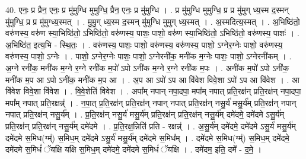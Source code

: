 \documentclass[17pt]{extarticle}
\begin{document}
40. एनः॒ प्र प्रैन॒ एनः॒ प्र मु॑मुग्धि मुमुग्धि॒ प्रैन॒ एनः॒ प्र मु॑मुग्धि । . प्र मु॑मुग्धि मुमुग्धि॒ प्र प्र मु॑मुग् ध्य॒स्म द॒स्मन् मु॑मुग्धि॒ प्र प्र मु॑मुग्ध्य॒स्मत् । . मु॒मु॒ग् ध्य॒स्म द॒स्मन् मु॑मुग्धि मुमुग् ध्य॒स्मत् । . अ॒स्मदित्य॒स्मत् । . अ॒भिष्ठि॑तो॒ वरु॑णस्य॒ वरु॑ण स्या॒भिष्ठि॑तो॒ ऽभिष्ठि॑तो॒ वरु॑णस्य॒ पाशः॒ पाशो॒ वरु॑ण स्या॒भिष्ठि॑तो॒ ऽभिष्ठि॑तो॒ वरु॑णस्य॒ पाशः॑ । . अ॒भिष्ठि॑त॒ इत्य॒भि - स्थि॒तः॒ । . वरु॑णस्य॒ पाशः॒ पाशो॒ वरु॑णस्य॒ वरु॑णस्य॒ पाशो॒ ऽग्नेर॒ग्नेः पाशो॒ वरु॑णस्य॒ वरु॑णस्य॒ पाशो॒ ऽग्नेः । . पाशो॒ ऽग्नेर॒ग्नेः पाशः॒ पाशो॒ ऽग्नेरनी॑क॒ मनी॑क म॒ग्नेः पाशः॒ पाशो॒ ऽग्नेरनी॑कम् । . अ॒ग्ने रनी॑क॒ मनी॑क म॒ग्ने र॒ग्ने रनी॑क म॒पो॑ ऽपो ऽनी॑क म॒ग्ने र॒ग्ने रनी॑क म॒पः । . अनी॑क म॒पो॑ ऽपो ऽनी॑क॒ मनी॑क म॒प आ ऽपो ऽनी॑क॒ मनी॑क म॒प आ । . अ॒प आ ऽपो॑ ऽप आ वि॑वेश विवे॒शा ऽपो॑ ऽप आ वि॑वेश । . आ वि॑वेश विवे॒शा वि॑वेश । . वि॒वे॒शेति॑ विवेश । . अपा᳚म् नपान् नपा॒दपा॒ मपा᳚म् नपात् प्रति॒रक्ष॑न् प्रति॒रक्ष॑न् नपा॒दपा॒ मपा᳚म् नपात् प्रति॒रक्षन्न्॑ । . न॒पा॒त् प्र॒ति॒रक्ष॑न् प्रति॒रक्ष॑न् नपान् नपात् प्रति॒रक्ष॑न् नसु॒र्य॑ मसु॒र्य॑म् प्रति॒रक्ष॑न् नपान् नपात् प्रति॒रक्ष॑न् नसु॒र्य᳚म् । . प्र॒ति॒रक्ष॑न् नसु॒र्य॑ मसु॒र्य॑म् प्रति॒रक्ष॑न् प्रति॒रक्ष॑न् नसु॒र्य॑म् दमे॑दमे॒ दमे॑दमे ऽसु॒र्य॑म् प्रति॒रक्ष॑न् प्रति॒रक्ष॑न् नसु॒र्य॑म् दमे॑दमे । . प्र॒ति॒रक्ष॒न्निति॑ प्रति - रक्षन्न्॑ । . अ॒सु॒र्य॑म् दमे॑दमे॒ दमे॑दमे ऽसु॒र्य॑ मसु॒र्य॑म् दमे॑दमे स॒मिध(ग्म्॑) स॒मिध॒म् दमे॑दमे ऽसु॒र्य॑ मसु॒र्य॑म् दमे॑दमे स॒मिध᳚म् । . दमे॑दमे स॒मिध(ग्म्॑) स॒मिध॒म् दमे॑दमे॒ दमे॑दमे स॒मिधं॑ ॅयक्षि यक्षि स॒मिध॒म् दमे॑दमे॒ दमे॑दमे स॒मिधं॑ ॅयक्षि । . दमे॑दम॒ इति॒ दमे᳚ - द॒मे॒ । \newline
\pagebreak
{}
\end{document}
